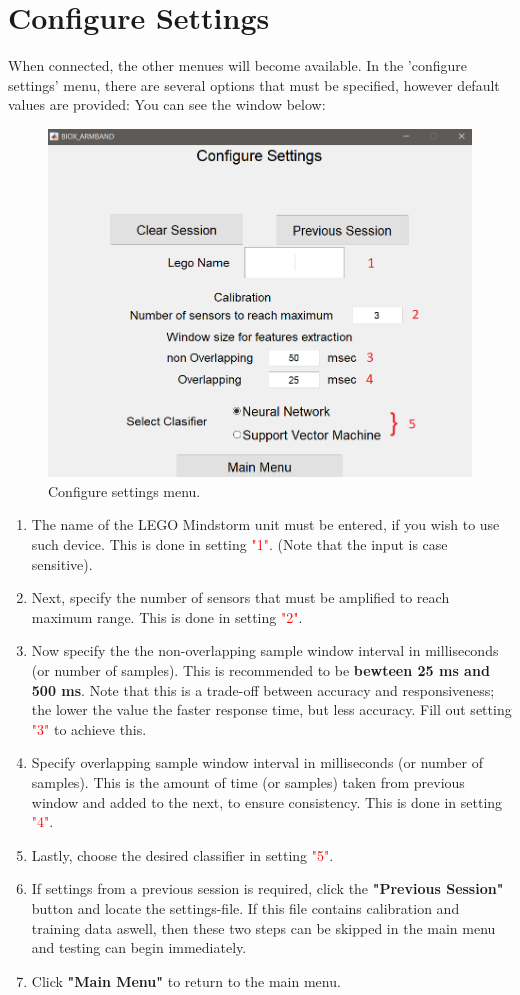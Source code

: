 \chapter{Configure Settings}

When connected, the other menues will become available. In the 'configure settings' menu, there are several options that must be specified, however default values are provided:
You can see the window below: \\
    \begin{figure}[H]
        \centering
        \includegraphics[width=0.6\linewidth]{figures/AppPics/2_Configure_settings_NEW.png}
        \caption{Configure settings menu.}
        \label{fig:my_label}
    \end{figure}

\begin{enumerate}[label=\textbf{Step \arabic*}:]
    \item The name of the LEGO Mindstorm unit must be entered, if you wish to use such device. This is done in setting \textcolor{red}{"1"}. (Note that the input is case sensitive).
    \item Next, specify the number of sensors that must be amplified to reach maximum range. This is done in setting \textcolor{red}{"2"}.
    \item Now specify the the non-overlapping sample window interval in milliseconds (or number of samples). This is recommended to be \textbf{bewteen 25 ms and 500 ms}. Note that this is a trade-off between accuracy and responsiveness; the lower the value the faster response time, but less accuracy. Fill out setting \textcolor{red}{"3"} to achieve this.
    \item Specify overlapping sample window interval in milliseconds (or number of samples). This is the amount of time (or samples) taken from previous window and added to the next, to ensure consistency. This is done in setting \textcolor{red}{"4"}.
    \item Lastly, choose the desired classifier in setting \textcolor{red}{"5"}.
    \item If settings from a previous session is required, click the \textbf{"Previous Session"} button and locate the settings-file. If this file contains calibration and training data aswell, then these two steps can be skipped in the main menu and testing can begin immediately.
    \item Click \textbf{"Main Menu"} to return to the main menu.
\end{enumerate}